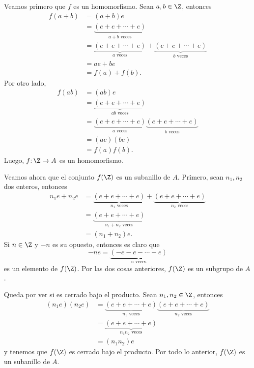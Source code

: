 \begin{sol}
	Veamos primero que $f$ es un homomorfismo. Sean $a,b \in \Z$, entonces 
	\begin{align*}
	f(a+b) &= (a+b)e \\
	&= \underbrace{(e+e+\cdots+e)}_\text{$a+b$ veces} \\
	&= \underbrace{(e+e+\cdots+e)}_\text{$a$ veces} + \underbrace{(e+e+\cdots+e)}_\text{$b$ veces} \\
	&= ae + be \\
	&= f(a) + f(b).
	\end{align*}
	Por otro lado, 
	\begin{align*}
	f(ab) &= (ab)e \\
	&= \underbrace{(e+e+\cdots+e)}_\text{$ab$ veces} \\
	&= \underbrace{(e+e+\cdots+e)}_\text{$a$ veces}\underbrace{(e+e+\cdots+e)}_\text{$b$ veces}  \\
	&= (ae)(be) \\
	&= f(a)f(b).
	\end{align*}
	Luego, $f\mathpunct{:} \Z \rightarrow A$ es un homomorfismo. 
	
	Veamos ahora que el conjunto $f(\Z)$ es un subanillo de $A$. Primero, sean $ n_1,n_2  $ dos enteros, entonces
	\begin{align*}
	n_1e+n_2e &= \underbrace{(e+e+\cdots+e)}_\text{$n_1$ veces} + \underbrace{(e+e+\cdots+e)}_\text{$n_2$ veces} \\
	&= \underbrace{(e+e+\cdots+e)}_\text{$n_1+n_2$ veces} \\
	&= (n_1+n_2)e.
	\end{align*}
	Si $ n \in \Z $ y $ -n $ es su opuesto, entonces es claro que
	 \[-ne = \underbrace{(-e-e-\cdots-e)}_\text{n veces}\] es un elemento de $f(\Z)$. Por las dos cosas anteriores, $f(\Z)$ es un subgrupo de $A$. 
	
	Queda por ver si es cerrado bajo el producto. Sean $ n_1,n_2 \in \Z $, entonces
	\begin{align*}
	(n_1e) (n_2e) &= \underbrace{(e+e+\cdots+e)}_\text{$n_1$ veces} \underbrace{(e+e+\cdots+e)}_\text{$n_2$ veces} \\
	&= \underbrace{(e+e+\cdots+e)}_\text{$n_1n_2$ veces} \\
	&= (n_1n_2)e
	\end{align*}
	y tenemos que $f(\Z)$ es cerrado bajo el producto. Por todo lo anterior, $f(\Z)$ es un subanillo de $A$.
\end{sol}

